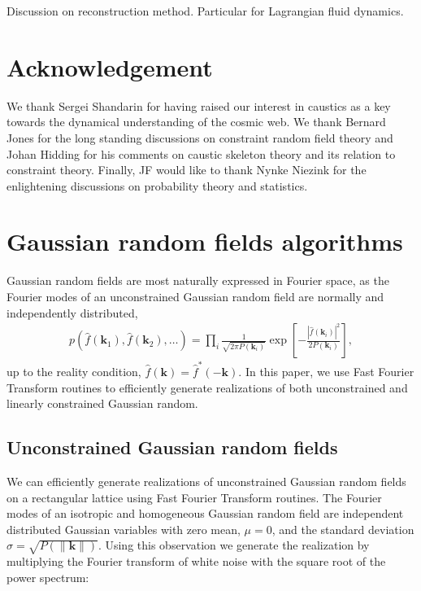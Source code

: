 \documentclass[a4paper, 11pt]{article}
\begin{document}
\begin{framed}
Discussion on reconstruction method. Particular for Lagrangian fluid dynamics.
\end{framed}

\section*{Acknowledgement}
We thank Sergei Shandarin for having raised our interest in caustics as a key towards the dynamical understanding of the cosmic web. We thank Bernard Jones for the long standing discussions on constraint random field theory and Johan Hidding for his comments on caustic skeleton theory and its relation to constraint theory. Finally, JF would like to thank Nynke Niezink for the enlightening discussions on probability theory and statistics. 



% 



\appendix
\section{Gaussian random fields algorithms}\label{ap:GRF}
Gaussian random fields are most naturally expressed in Fourier space, as the Fourier modes of an unconstrained Gaussian random field are normally and independently distributed, 
\begin{align}
p(\hat{f}(\bm{k}_1), \hat{f}(\bm{k}_2), \dots) = \prod_{i} \frac{1}{\sqrt{2\pi P(\bm{k}_i)}} \exp\left[-\frac{|\hat{f}(\bm{k}_i)|^2}{2P(\bm{k}_i)}\right],
\end{align}
up to the reality condition, $\hat{f}(\bm{k})=\hat{f}^*(-\bm{k})$. In this paper, we use Fast Fourier Transform routines to efficiently generate realizations of both unconstrained and linearly constrained Gaussian random.

\subsection{Unconstrained Gaussian random fields}
We can efficiently generate realizations of unconstrained Gaussian random fields on a rectangular lattice using Fast Fourier Transform routines. The Fourier modes of an isotropic and homogeneous Gaussian random field are independent distributed Gaussian variables with zero mean, $\mu=0$, and the standard deviation $\sigma = \sqrt{P(\|\bm{k}\|)}$. Using this observation we generate the realization by multiplying the Fourier transform of white noise with the square root of the power spectrum:\\
\end{document}
